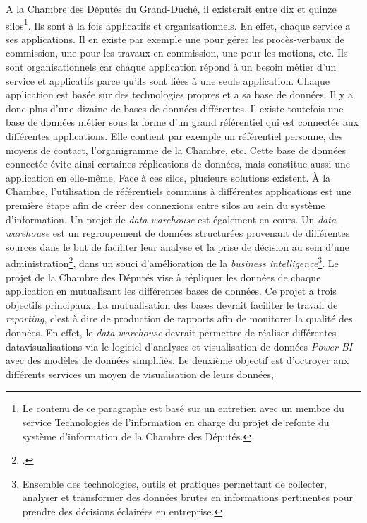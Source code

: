 A la Chambre des Députés du Grand-Duché, il existerait entre dix et
quinze silos\footnote{Le contenu de ce paragraphe est basé sur un
	entretien avec un membre du service Technologies de l'information en
	charge du projet de refonte du système d'information de la Chambre
	des Députés.}. Ils sont à la fois applicatifs et organisationnels. En
effet, chaque service a ses applications. Il en existe par exemple une
pour gérer les procès-verbaux de commission, une pour les travaux en
commission, une pour les motions, etc. Ils sont organisationnels car
chaque application répond à un besoin métier d'un service et applicatifs
parce qu'ils sont liées à une seule application. Chaque application est
basée sur des technologies propres et a sa base de données. Il y a donc
plus d'une dizaine de bases de données différentes. Il existe toutefois
une base de données métier sous la forme d'un grand référentiel qui est
connectée aux différentes applications. Elle contient par exemple un
référentiel personne, des moyens de contact, l'organigramme de la
Chambre, etc. Cette base de données connectée évite ainsi certaines
réplications de données, mais constitue aussi une application en elle-même. Face à ces silos, plusieurs solutions existent.
À la Chambre, l'utilisation de référentiels  communs à différentes applications
est une première étape afin de créer des connexions entre silos au sein
du système d'information. Un projet de \emph{data warehouse} est
également en cours. Un \emph{data warehouse} est un regroupement de
données structurées provenant de différentes sources dans le but de
faciliter leur analyse et la prise de décision au sein d'une
administration\footcite{noauthor_quest-ce_nodate},
dans un souci d'amélioration de la \emph{business
	intelligence}\footnote{Ensemble des technologies, outils et pratiques permettant de collecter, analyser et transformer des données brutes en informations pertinentes pour prendre des décisions éclairées en entreprise.}. Le projet de la Chambre des
Députés vise à répliquer les données de chaque application en
mutualisant les différentes bases de données. Ce projet a trois
objectifs principaux. La mutualisation des bases devrait faciliter le
travail de \textit{reporting}, c'est à dire de production de rapports afin de
monitorer la qualité des données. En effet, le \emph{data warehouse} devrait
permettre de réaliser différentes datavisualisations via le logiciel
d'analyses et visualisation de données \emph{Power BI} avec des modèles
de données simplifiés. Le deuxième objectif est d'octroyer aux
différents services un moyen de visualisation de leurs données,

